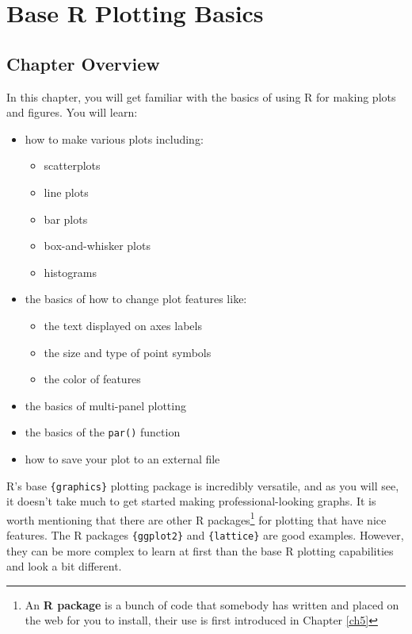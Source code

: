 \documentclass[]{book}
\providecommand{\tightlist}{%
  \setlength{\itemsep}{0pt}\setlength{\parskip}{0pt}}
\let\rmarkdownfootnote\footnote%
\def\footnote{\protect\rmarkdownfootnote}
\theoremstyle{definition}
\theoremstyle{definition}
\theoremstyle{definition}
\theoremstyle{remark}
\begin{document}
\chapter{Base R Plotting Basics}\label{ch2}

\section*{Chapter Overview}\label{chapter-overview-1}

In this chapter, you will get familiar with the basics of using R for
making plots and figures. You will learn:

\begin{itemize}
\tightlist
\item
  how to make various plots including:

  \begin{itemize}
  \tightlist
  \item
    scatterplots
  \item
    line plots
  \item
    bar plots
  \item
    box-and-whisker plots
  \item
    histograms
  \end{itemize}
\item
  the basics of how to change plot features like:

  \begin{itemize}
  \tightlist
  \item
    the text displayed on axes labels
  \item
    the size and type of point symbols
  \item
    the color of features
  \end{itemize}
\item
  the basics of multi-panel plotting
\item
  the basics of the \texttt{par()} function
\item
  how to save your plot to an external file
\end{itemize}

R's base \texttt{\{graphics\}} plotting package is incredibly versatile,
and as you will see, it doesn't take much to get started making
professional-looking graphs. It is worth mentioning that there are other
R packages\footnote{An \textbf{R package} is a bunch of code that
  somebody has written and placed on the web for you to install, their
  use is first introduced in Chapter \ref{ch5}} for plotting that have
nice features. The R packages \texttt{\{ggplot2\}} \citep{R-ggplot2} and
\texttt{\{lattice\}} \citep{R-lattice} are good examples. However, they
can be more complex to learn at first than the base R plotting
capabilities and look a bit different.
\end{document}
